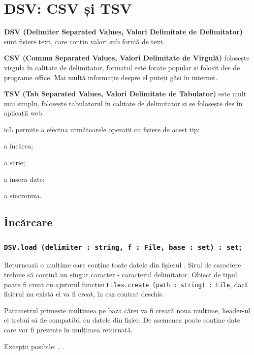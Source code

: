 \section{DSV: CSV și TSV}

{\bf DSV (Delimiter Separated Values, Valori Delimitate de Delimitator)} sunt fișiere text, care conțin valori sub formă de text.

{\bf CSV (Comma Separated Values, Valori Delimitate de Virgulă)} folosește virgula în calitate de delimitator, formatul este forate popular și folosit des de programe office. Mai multă informație despre el puteți găsi în internet.

{\bf TSV (Tab Separated Values, Valori Delimitate de Tabulator)} este mult mai simplu, folosește tabulatorul în calitate de delimitator și se folosește des în aplicații web.

icL permite a efectua următoarele operații cu fișiere de acest tip:
\begin{icItems}
	\item a încărca;
	\item a scrie;
	\item a insera date;
	\item a sincroniza.
\end{icItems}

\subsection{Încărcare}

\subsubsection{\lstinline|DSV.load (delimiter : string, f : File, base : set) : set|;}

Returnează o mulțime care conține toate datele din fișierul . Șirul de caractere  trebuie să conțină un singur caracter - caracterul delimitator. Obiect de tipul  poate fi creat cu ajutorul funcției \lstinline|Files.create (path : string) : File|, dacă fișierul nu există el va fi creat, în caz contrat deschis.

Parametrul  primește mulțimea pe baza cărei va fi creată noua mulțime, header-ul ei trebui să fie compatibil cu datele din fișier. De asemenea poate conține date care vor fi prezente în mulțimea returnată.

Excepții posibile: , .

